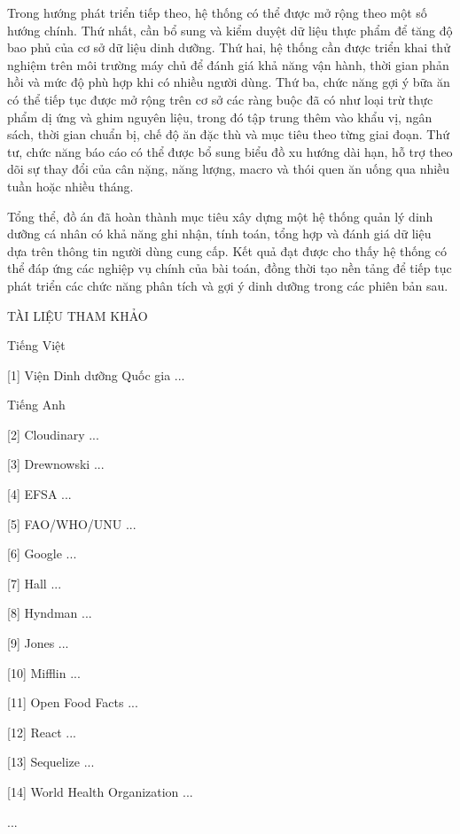 \documentclass[12pt, a4paper]{report}
\begin{document}
Trong hướng phát triển tiếp theo, hệ thống có thể được mở rộng theo một số hướng chính. Thứ nhất, cần bổ sung và kiểm duyệt dữ liệu thực phẩm để tăng độ bao phủ của cơ sở dữ liệu dinh dưỡng. Thứ hai, hệ thống cần được triển khai thử nghiệm trên môi trường máy chủ để đánh giá khả năng vận hành, thời gian phản hồi và mức độ phù hợp khi có nhiều người dùng. Thứ ba, chức năng gợi ý bữa ăn có thể tiếp tục được mở rộng trên cơ sở các ràng buộc đã có như loại trừ thực phẩm dị ứng và ghim nguyên liệu, trong đó tập trung thêm vào khẩu vị, ngân sách, thời gian chuẩn bị, chế độ ăn đặc thù và mục tiêu theo từng giai đoạn. Thứ tư, chức năng báo cáo có thể được bổ sung biểu đồ xu hướng dài hạn, hỗ trợ theo dõi sự thay đổi của cân nặng, năng lượng, macro và thói quen ăn uống qua nhiều tuần hoặc nhiều tháng.

Tổng thể, đồ án đã hoàn thành mục tiêu xây dựng một hệ thống quản lý dinh dưỡng cá nhân có khả năng ghi nhận, tính toán, tổng hợp và đánh giá dữ liệu dựa trên thông tin người dùng cung cấp. Kết quả đạt được cho thấy hệ thống có thể đáp ứng các nghiệp vụ chính của bài toán, đồng thời tạo nền tảng để tiếp tục phát triển các chức năng phân tích và gợi ý dinh dưỡng trong các phiên bản sau.

TÀI LIỆU THAM KHẢO

Tiếng Việt

[1] Viện Dinh dưỡng Quốc gia ...

Tiếng Anh

[2] Cloudinary ...

[3] Drewnowski ...

[4] EFSA ...

[5] FAO/WHO/UNU ...

[6] Google ...

[7] Hall ...

[8] Hyndman ...

[9] Jones ...

[10] Mifflin ...

[11] Open Food Facts ...

[12] React ...

[13] Sequelize ...

[14] World Health Organization ...

...
\end{document}
